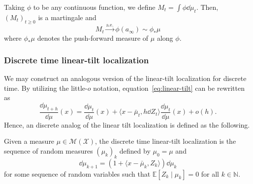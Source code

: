 \begin{corollary}\label{cor:lim_mart}
  Taking \(\phi\) to be any continuous function, we define \(M_t = \int \phi \dd\mu_t\). Then,
  \((M_t)_{t \ge 0}\) is a martingale and
  \begin{equation}\label{eq:lim_mart}
    M_t \xrightarrow{\text{a.e.}} \phi(a_\infty) \sim \phi_* \mu
  \end{equation}
  where \(\phi_*\mu\) denotes the push-forward measure of \(\mu\) along \(\phi\).
\end{corollary}

\subsubsection{Discrete time linear-tilt localization}\label{sec:discrete_tilt}

We may construct an analogous version of the linear-tilt localization for discrete time. By utilizing 
the little-\(o\) notation, equation~\eqref{eq:linear-tilt} can be rewritten as 
\[\frac{\dd \mu_{t + h}}{\dd \mu}(x) = 
  \frac{\dd \mu_t}{\dd \mu}(x) + \langle x - \bar{\mu}_t, h\dd Z_t\rangle \frac{\dd \mu_t}{\dd \mu}(x) 
  + o(h).\]
Hence, an discrete analog of the linear tilt localization is defined as the following.

\begin{definition}
  Given a measure \(\mu \in \mathcal{M}(\mathcal{X})\), the discrete time linear-tilt localization 
  is the sequence of random measures \((\mu_k)_k\) defined by \(\mu_0 = \mu\) and 
  \begin{equation}\label{eq:discrete_tilt}
    \dd \mu_{k + 1} = (1 + \langle x - \bar{\mu}_k, Z_k \rangle)\dd \mu_k
  \end{equation} 
  for some sequence of random variables such that \(\mathbb{E}[Z_k \mid \mu_k] = 0\) for all 
  \(k \in \mathbb{N}\).
\end{definition}

